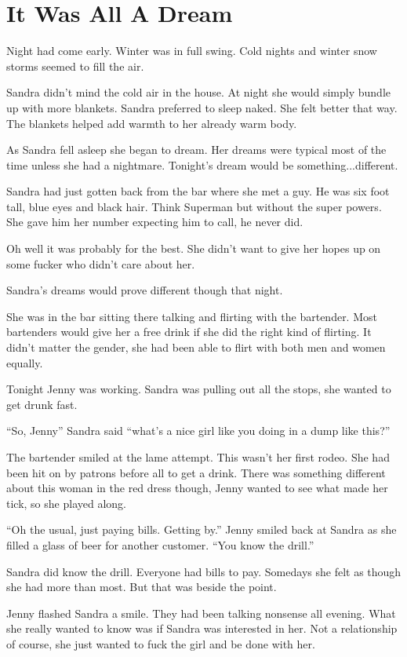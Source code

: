 \section{It Was All A Dream}

Night had come early. Winter was in full swing. Cold nights and winter snow storms seemed to fill the air.

Sandra didn’t mind the cold air in the house. At night she would simply bundle up with more blankets. Sandra preferred to sleep naked. She felt better that way. The blankets helped add warmth to her already warm body.

As Sandra fell asleep she began to dream. Her dreams were typical most of the time unless she had a nightmare. Tonight’s dream would be something...different.

Sandra had just gotten back from the bar where she met a guy. He was six foot tall, blue eyes and black hair. Think Superman but without the super powers. She gave him her number expecting him to call, he never did.

Oh well it was probably for the best. She didn’t want to give her hopes up on some fucker who didn’t care about her.

Sandra’s dreams would prove different though that night.

She was in the bar sitting there talking and flirting with the bartender. Most bartenders would give her a free drink if she did the right kind of flirting. It didn’t matter the gender, she had been able to flirt with both men and women equally.

Tonight Jenny was working. Sandra was pulling out all the stops, she wanted to get drunk fast.

“So, Jenny” Sandra said “what’s a nice girl like you doing in a dump like this?”

The bartender smiled at the lame attempt. This wasn’t her first rodeo. She had been hit on by patrons before all to get a drink. There was something different about this woman in the red dress though, Jenny wanted to see what made her tick, so she played along.

“Oh the usual, just paying bills. Getting by.” Jenny smiled back at Sandra as she filled a glass of beer for another customer. “You know the drill.”

Sandra did know the drill. Everyone had bills to pay. Somedays she felt as though she had more than most. But that was beside the point.

Jenny flashed Sandra a smile. They had been talking nonsense all evening. What she really wanted to know was if Sandra was interested in her. Not a relationship of course, she just wanted to fuck the girl and be done with her.

